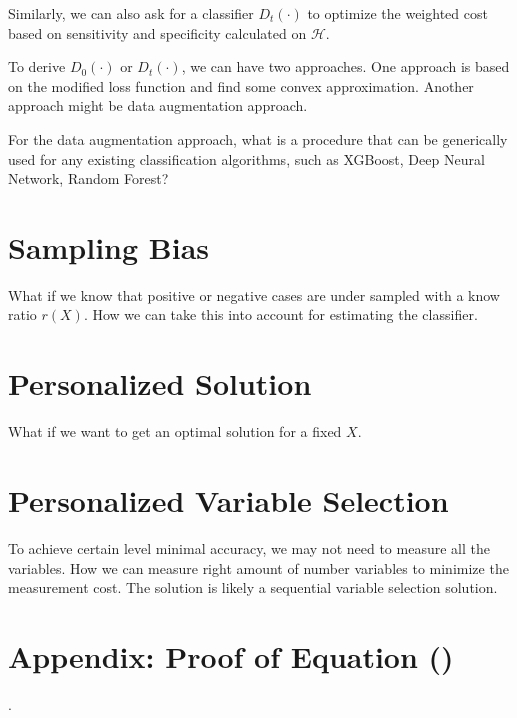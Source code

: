 \documentclass[12pt]{article}
\def\cal{\mathcal}
\def\calH{{\cal H}} %
\begin{document}
Similarly, we can also ask for a classifier $D_t(\cdot)$ to optimize the weighted cost based on sensitivity and specificity calculated on $\calH$.

To derive $D_0(\cdot)$ or $D_t(\cdot)$, we can have two approaches. One approach is based on the modified loss function and find some convex approximation. Another approach might be data augmentation approach. 

For the data augmentation approach, what is a procedure that can be generically used for any existing classification algorithms, such as XGBoost, Deep Neural Network, Random Forest?

\section{Sampling Bias}
What if we know that positive or negative cases are under sampled with a know ratio $r(X)$. How we can take this into account for estimating the classifier.

\section{Personalized Solution}
What if we want to get an optimal solution for a fixed $X$.

\section{Personalized Variable Selection}
To achieve certain level minimal accuracy, we may not need to measure all the variables. How we can measure right amount of number variables to minimize the measurement cost. 
The solution is likely a sequential variable selection solution.

\section*{Appendix: Proof of Equation ()}.






\end{document}

